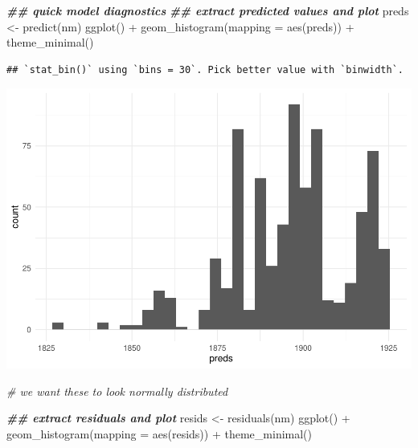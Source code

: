 \documentclass[
]{article}
\newenvironment{Shaded}{\begin{snugshade}}{\end{snugshade}}
\newcommand{\AttributeTok}[1]{\textcolor[rgb]{0.77,0.63,0.00}{#1}}
\newcommand{\CommentTok}[1]{\textcolor[rgb]{0.56,0.35,0.01}{\textit{#1}}}
\newcommand{\DocumentationTok}[1]{\textcolor[rgb]{0.56,0.35,0.01}{\textbf{\textit{#1}}}}
\newcommand{\FunctionTok}[1]{\textcolor[rgb]{0.00,0.00,0.00}{#1}}
\newcommand{\NormalTok}[1]{#1}
\newcommand{\OtherTok}[1]{\textcolor[rgb]{0.56,0.35,0.01}{#1}}
\newcommand{\SpecialCharTok}[1]{\textcolor[rgb]{0.00,0.00,0.00}{#1}}
\begin{document}
\begin{Shaded}
\begin{Highlighting}[]
\DocumentationTok{\#\# quick model diagnostics}
\DocumentationTok{\#\# extract predicted values and plot}
\NormalTok{preds }\OtherTok{\textless{}{-}} \FunctionTok{predict}\NormalTok{(nm) }
\FunctionTok{ggplot}\NormalTok{() }\SpecialCharTok{+} 
  \FunctionTok{geom\_histogram}\NormalTok{(}\AttributeTok{mapping =} \FunctionTok{aes}\NormalTok{(preds)) }\SpecialCharTok{+} 
  \FunctionTok{theme\_minimal}\NormalTok{() }
\end{Highlighting}
\end{Shaded}

\begin{verbatim}
## `stat_bin()` using `bins = 30`. Pick better value with `binwidth`.
\end{verbatim}

\includegraphics{SCMU_egg_model_files/figure-latex/null_model-1.pdf}

\begin{Shaded}
\begin{Highlighting}[]
\CommentTok{\# we want these to look normally distributed}

\DocumentationTok{\#\# extract residuals and plot}
\NormalTok{resids }\OtherTok{\textless{}{-}} \FunctionTok{residuals}\NormalTok{(nm) }
\FunctionTok{ggplot}\NormalTok{() }\SpecialCharTok{+} 
  \FunctionTok{geom\_histogram}\NormalTok{(}\AttributeTok{mapping =} \FunctionTok{aes}\NormalTok{(resids)) }\SpecialCharTok{+} 
  \FunctionTok{theme\_minimal}\NormalTok{()}
\end{Highlighting}
\end{Shaded}
\end{document}
